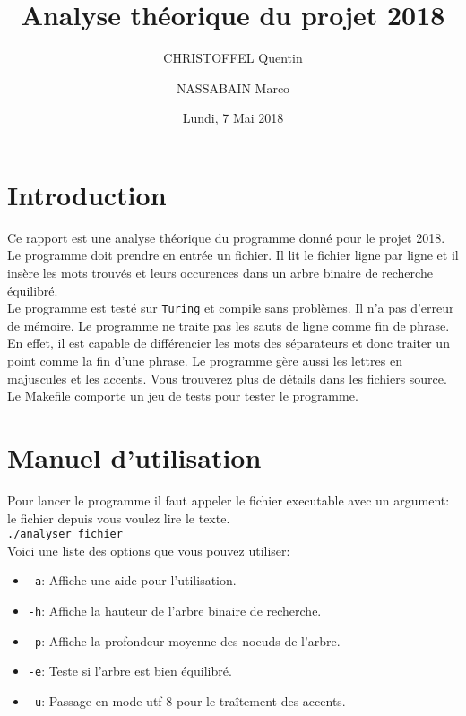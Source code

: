 \documentclass[11pt]{article}
\title{Analyse théorique du projet 2018}
\author{
    CHRISTOFFEL Quentin
    \and
    NASSABAIN Marco
}
\date{Lundi, 7 Mai 2018}
\begin{document}
\maketitle


\section{Introduction}
    Ce rapport est une analyse théorique du programme donné pour le projet 2018.
    Le programme doit prendre en entrée un fichier. Il lit le fichier ligne
    par ligne et il insère les mots trouvés et leurs occurences dans un arbre
    binaire de recherche équilibré.\\

    Le programme est testé sur \texttt{Turing} et compile sans problèmes. Il n'a
    pas d'erreur de mémoire. Le
    programme ne traite pas les sauts de ligne comme fin de phrase. En effet,
    il est capable de différencier les mots des séparateurs et donc traiter un
    point comme la fin d'une phrase. Le programme gère aussi les lettres en
    majuscules et les accents. Vous trouverez plus de détails dans les fichiers
    source. Le Makefile comporte un jeu de tests pour tester le programme.\\


\section{Manuel d'utilisation}
    Pour lancer le programme il faut appeler le fichier executable avec un
    argument: le fichier depuis vous voulez lire le texte.\\
        \texttt{./analyser fichier}\\

    \noindent
    Voici une liste des options que vous pouvez utiliser:

    \begin{itemize}
        \item \texttt{-a}: Affiche une aide pour l'utilisation.
        \item \texttt{-h}: Affiche la hauteur de l'arbre binaire de recherche.
        \item \texttt{-p}: Affiche la profondeur moyenne des noeuds de l'arbre.
        \item \texttt{-e}: Teste si l'arbre est bien équilibré.
        \item \texttt{-u}: Passage en mode utf-8 pour le traîtement des accents.
    \end{itemize}
\end{document}
